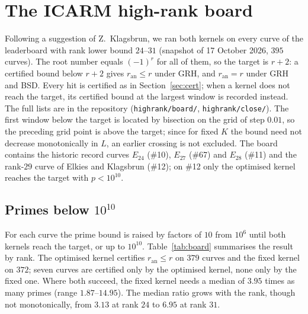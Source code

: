 \documentclass[11pt]{amsart}
\theoremstyle{remark}
\theoremstyle{definition}
\newcommand{\ran}{r_{\mathrm{an}}}
\begin{document}
\section{The ICARM high-rank board}\label{sec:board}
Following a suggestion of Z.~Klagsbrun, we ran both kernels on every curve of the leaderboard with rank lower bound $24$--$31$ (snapshot of 17 October 2026, $395$ curves). The root number equals $(-1)^r$ for all of them, so the target is $r+2$: a certified bound below $r+2$ gives $\ran\le r$ under GRH, and $\ran=r$ under GRH and BSD. Every hit is certified as in Section~\ref{sec:cert}; when a kernel does not reach the target, its certified bound at the largest window is recorded instead. The full lists are in the repository (\texttt{highrank/board/}, \texttt{highrank/close/}). The first window below the target is located by bisection on the grid of step $0.01$, so the preceding grid point is above the target; since for fixed $K$ the bound need not decrease monotonically in $L$, an earlier crossing is not excluded. The board contains the historic record curves $E_{24}$ (\#10), $E_{27}$ (\#67) and $E_{28}$ (\#11) and the rank-$29$ curve of Elkies and Klagsbrun (\#12); on \#12 only the optimised kernel reaches the target with $p<10^{10}$.

\subsection*{\texorpdfstring{Primes below $10^{10}$}{Primes below 1e10}}
For each curve the prime bound is raised by factors of $10$ from $10^6$ until both kernels reach the target, or up to $10^{10}$. Table~\ref{tab:board} summarises the result by rank. The optimised kernel certifies $\ran\le r$ on $379$ curves and the fixed kernel on $372$; seven curves are certified only by the optimised kernel, none only by the fixed one. Where both succeed, the fixed kernel needs a median of $3.95$ times as many primes (range $1.87$--$14.95$). The median ratio grows with the rank, though not monotonically, from $3.13$ at rank $24$ to $6.95$ at rank $31$.
\end{document}
